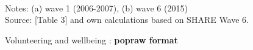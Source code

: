 \documentclass[10pt, letterpaper]{article}
\begin{document}
\begin{spacing}{1.4}
\begin{figure}[H]
\centering
\caption{Volunteering and wellbeing : \textbf{popraw format}} 
\label{fig:taub}
\begin{minipage}{1\linewidth}
\quad
{}~\\
{\footnotesize Notes: (a) wave 1 (2006-2007), (b) wave 6 (2015) }~\\
{\footnotesize Source: \citet{haski09} [Table 3] and own calculations based on SHARE Wave 6.}
\end{minipage}
\end{figure} 

%



\end{spacing}
\end{document}
